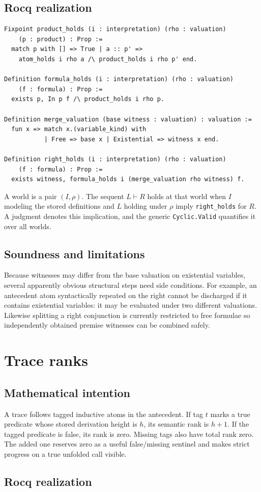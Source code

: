 \documentclass[11pt,oneside]{book}
\DeclareRobustCommand{\code}[1]{\nolinkurl{#1}}
\newcommand{\mathintent}{\subsection*{Mathematical intention}}
\newcommand{\rocqreal}{\subsection*{Rocq realization}}
\newcommand{\soundlim}{\subsection*{Soundness and limitations}}
\begin{document}
\rocqreal

\begin{lstlisting}[caption={Products, DNF formulae, and right-hand witnesses.}]
Fixpoint product_holds (i : interpretation) (rho : valuation)
    (p : product) : Prop :=
  match p with [] => True | a :: p' =>
    atom_holds i rho a /\ product_holds i rho p' end.

Definition formula_holds (i : interpretation) (rho : valuation)
    (f : formula) : Prop :=
  exists p, In p f /\ product_holds i rho p.

Definition merge_valuation (base witness : valuation) : valuation :=
  fun x => match x.(variable_kind) with
           | Free => base x | Existential => witness x end.

Definition right_holds (i : interpretation) (rho : valuation)
    (f : formula) : Prop :=
  exists witness, formula_holds i (merge_valuation rho witness) f.
\end{lstlisting}
A world is a pair \((I,\rho)\).  The sequent \(L\vdash R\) holds at that world
when \(I\) modeling the stored definitions and \(L\) holding under \(\rho\)
imply \code{right_holds} for \(R\).  A judgment denotes this implication, and
the generic \code{Cyclic.Valid} quantifies it over all worlds.

\soundlim

Because witnesses may differ from the base valuation on existential
variables, several apparently obvious structural steps need side conditions.
For example, an antecedent atom syntactically repeated on the right cannot be
discharged if it contains existential variables: it may be evaluated under two
different valuations.  Likewise splitting a right conjunction is currently
restricted to free formulae so independently obtained premise witnesses can be
combined safely.

\section{Trace ranks}

\mathintent

A trace follows tagged inductive atoms in the antecedent.  If tag \(t\) marks
a true predicate whose stored derivation height is \(h\), its semantic rank is
\(h+1\).  If the tagged predicate is false, its rank is zero.  Missing tags also
have total rank zero.  The added one reserves zero as a useful false/missing
sentinel and makes strict progress on a true unfolded call visible.

\rocqreal
\end{document}
